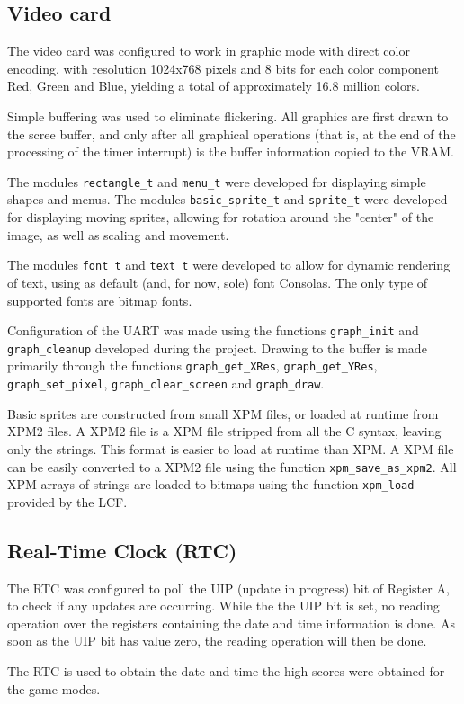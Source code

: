 \documentclass{article}
\theoremstyle{remark}
\begin{document}
\subsection{Video card}
The video card was configured to work in graphic mode with direct color encoding, with resolution 1024x768 pixels and 8 bits for each color component Red, Green and Blue, yielding a total of approximately 16.8 million colors. \par
Simple buffering was used to eliminate flickering. All graphics are first drawn to the scree buffer, and only after all graphical operations (that is, at the end of the processing of the timer interrupt) is the buffer information copied to the VRAM. \par
The modules \texttt{rectangle\_t} and \texttt{menu\_t} were developed for displaying simple shapes and menus. The modules \texttt{basic\_sprite\_t} and \texttt{sprite\_t} were developed for displaying moving sprites, allowing for rotation around the "center" of the image, as well as scaling and movement. \par
The modules \texttt{font\_t} and \texttt{text\_t} were developed to allow for dynamic rendering of text, using as default (and, for now, sole) font Consolas. The only type of supported fonts are bitmap fonts. \par
Configuration of the UART was made using the functions \texttt{graph\_init} and \texttt{graph\_cleanup} developed during the project. Drawing to the buffer is made primarily through the functions \texttt{graph\_get\_XRes}, \linebreak \texttt{graph\_get\_YRes}, \texttt{graph\_set\_pixel}, \texttt{graph\_clear\_screen} and \texttt{graph\_draw}.\par
Basic sprites are constructed from small XPM files, or loaded at runtime from XPM2 files. A XPM2 file is a XPM file stripped from all the C syntax, leaving only the strings. This format is easier to load at runtime than XPM. A XPM file can be easily converted to a XPM2 file using the function \texttt{xpm\_save\_as\_xpm2}. All XPM arrays of strings are loaded to bitmaps using the function \texttt{xpm\_load} provided by the LCF.
\subsection{Real-Time Clock (RTC)}
The RTC was configured to poll the UIP (update in progress) bit of Register A, to check if any updates are occurring. While the the UIP bit is set, no reading operation over the registers containing the date and time information is done. As soon as the UIP bit has value zero, the reading operation will then be done.\par
The RTC is used to obtain the date and time the high-scores were obtained for the game-modes.
\end{document}
